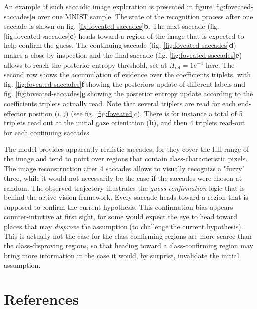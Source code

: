 \documentclass{article}
\begin{document}
An example of such saccadic image exploration is presented in figure \ref{fig:foveated-saccades}\textbf{a} over one MNIST sample.
The state of the recognition process after one saccade is shown on fig. \ref{fig:foveated-saccades}\textbf{b}. The next saccade (fig. \ref{fig:foveated-saccades}\textbf{c})  heads toward a region of the image that is expected to help confirm the guess. The continuing saccade (fig. \ref{fig:foveated-saccades}\textbf{d}) makes a close-by inspection and the final saccade (fig. \ref{fig:foveated-saccades}\textbf{e}) allows to reach the posterior entropy threshold, set at $H_\text{ref} = 1e^{-4}$ here. The second row shows the accumulation of evidence over the coefficients triplets, with fig. \ref{fig:foveated-saccades}\textbf{f} showing the posteriors update of different labels and fig. \ref{fig:foveated-saccades}\textbf{g} showing the posterior entropy update according to the coefficients triplets actually read. Note that several triplets are read for each end-effector position ($i,j$) (see fig. \ref{fig:foveated}c). There is for instance a total of 5 triplets read out at the initial gaze orientation (\textbf{b}), and then 4 triplets read-out for each continuing saccades.

The model provides apparently realistic saccades, for they cover the full range of the image and tend to point over regions that contain class-characteristic pixels. The image reconstruction after 4 saccades allows to visually recognize a "fuzzy" three, while it would not necessarily be the case if the saccades were chosen at random.
The observed trajectory illustrates the \emph{guess confirmation} logic that is behind the active vision framework. Every saccade heads toward a region that is supposed to confirm the current hypothesis. This confirmation bias appears counter-intuitive at first sight, for some would expect the eye to head toward places that may \emph{disprove} the assumption (to challenge the current hypothesis). This is actually not the case for the class-confirming regions are more scarce than the class-disproving regions, so that heading toward a class-confirming region may bring more information in the case it would, by surprise, invalidate the initial assumption.



\section*{References}


\end{document}
